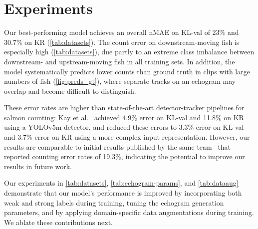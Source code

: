 \section{Experiments}



Our best-performing model achieves an overall nMAE on KL-val of 23\% and 30.7\% on KR (\cref{tab:datasets}).%
The count error on downstream-moving fish is especially high (\cref{tab:datasets}), due partly to an extreme class imbalance between downstream- and upstream-moving fish in all training sets. In addition, the model systematically predicts lower counts than ground truth in clips with large numbers of fish (\cref{fig:preds_gt}), where separate tracks on an echogram may overlap and become difficult to distinguish.

These error rates are higher than state-of-the-art detector-tracker pipelines for salmon counting: Kay et al.~\cite{kay2022caltechfishcountingdataset} achieved 4.9\% error on KL-val and 11.8\% on KR using a YOLOv5m detector, and reduced these errors to 3.3\% error on KL-val and 3.7\% error on KR using a more complex input representation. However, our results are comparable to initial results published by the same team~\cite{kulits2020automated} that reported counting error rates of 19.3\%, indicating the potential to improve our results in future work.

Our experiments in \cref{tab:datasets}, \cref{tab:echogram-params}, and \cref{tab:dataaug} demonstrate that our model's performance is improved by incorporating both weak and strong labels during training, tuning the echogram generation parameters, and by applying domain-specific data augmentations during training. We ablate these contributions next.

